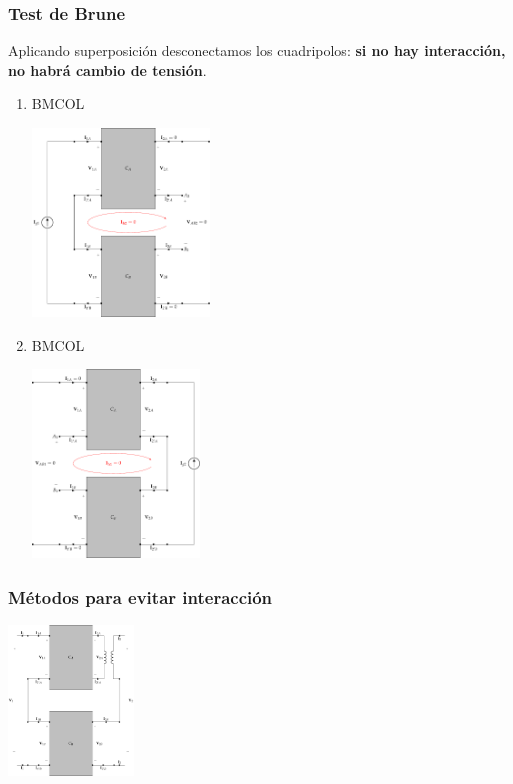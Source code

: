 \subsubsection{Test de Brune}
\label{sec:org9a27190}
Aplicando superposición desconectamos los cuadripolos: \textbf{si no hay interacción, no habrá cambio de tensión}.
\begin{enumerate}
\item \hfill{}\textsc{BMCOL}
\label{sec:org3157d40}
\begin{center}
\includegraphics[height=5cm]{../figs/serie-serie-brune-entrada.pdf}
\end{center}
\item \hfill{}\textsc{BMCOL}
\label{sec:org355faf6}
\begin{center}
\includegraphics[height=5cm]{../figs/serie-serie-brune-salida.pdf}
\end{center}
\end{enumerate}


\subsubsection{Métodos para evitar interacción}
\label{sec:org033b270}
\begin{center}
\includegraphics[height=4cm]{../figs/serie-serie-transformador.pdf}
\end{center}

